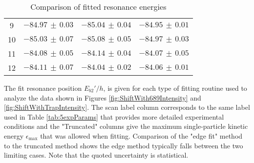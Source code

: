 \begin{table}[]
{\begin{tabular}{|c|ccc|}
		9 & $-84.97\,\pm\,0.03$ & $-85.04\,\pm\,0.04$ & $-84.95\,\pm\,0.01$ \\
		10 & $-85.03\,\pm\,0.07$ & $-85.08\,\pm\,0.05$ & $-84.97\,\pm\,0.03$ \\
		11 & $-84.08\,\pm\,0.05$ & $-84.14\,\pm\,0.04$ & $-84.07\,\pm\,0.05$ \\
		12 & $-84.11\,\pm\,0.07$ & $-84.04\,\pm\,0.02$ & $-84.06\,\pm\,0.01$ \\ \hline
		\end{tabular}%
		}
		\caption{Comparison of fitted resonance energies}{The fit resonance position $E_{b2}'/h$, is given for each type of fitting routine used to analyze the data shown in Figures \ref{fig:ShiftWith689Intensity} and \ref{fig:ShiftWithTrapIntensity}. The scan label column corresponds to the same label used in Table \ref{tab:5expParams} that provides more detailed experimental conditions and the "Truncated" columns give the maximum single-particle kinetic energy $\epsilon_\text{max}$ that was allowed when fitting. Comparison of the "edge fit" method to the truncated method shows the edge method typically falls between the two limiting cases. Note that the quoted uncertainty is statistical.}
		\label{tab:ComparisonFitting}
	\end{table}

